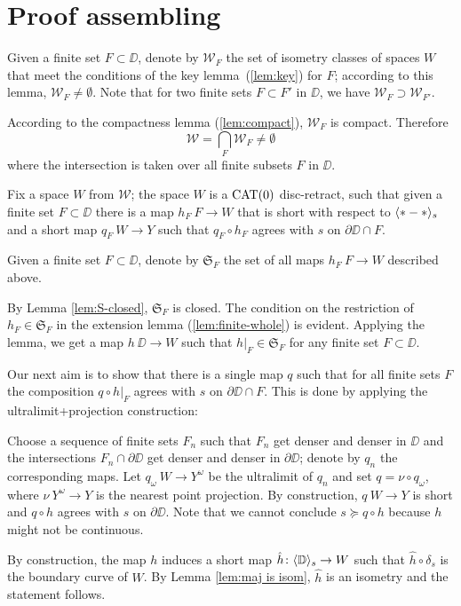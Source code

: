 \section{Proof assembling}\label{Main theorem}



Given a finite set $F\subset \DD$,
denote by $\mathcal{W}_F$
the set of isometry classes of spaces $W$ that meet the conditions of the key lemma~(\ref{lem:key})
for $F$;
according to this lemma, $\mathcal{W}_F\ne\emptyset$.
Note that for two finite sets $F\subset F'$ in $\DD$,
we have $\mathcal{W}_F\supset \mathcal{W}_{F'}$.

According to the compactness lemma (\ref{lem:compact}), $\mathcal{W}_F$ is compact.
Therefore 
\[\mathcal{W}
=
\bigcap_{F}\mathcal{W}_F\ne \emptyset\]
where the intersection is taken over all finite subsets $F$ in $\DD$. 


Fix a space $W$ from $\mathcal{W}$;
the space $W$ is a $\mathop{\rm CAT}\nolimits(0)$ disc-retract,
such that given a finite set $F\subset \DD$ there is a map $h_F\:F\to W$ that is short with 
respect to $\langle{*}-{*}\rangle_s$ 
and a short map $q_F\:W\to Y$ such that $q_F\circ h_F$ agrees with $s$ on $\partial\DD\cap F$.

Given a finite set $F\subset \DD$,
denote by $\mathfrak{S}_F$ the set of all maps $h_F\:F\to W$ described above.

By Lemma \ref{lem:S-closed}, $\mathfrak{S}_F$ is closed.
The condition on the restriction of $h_F\in  \mathfrak{S}_F$ in the extension lemma (\ref{lem:finite-whole}) is evident.
Applying the lemma,
we get a map $h\:\DD\to W$ such that $h|_F\in \mathfrak{S}_F$
for any finite set $F\subset \DD$.

Our next aim is to show that there is a single map $q$ such that
for all finite sets $F$ the composition $q\circ h|_F$ agrees with
$s$ on $\partial\DD\cap F$.
This is done by applying the ultralimit+projection construction:

Choose a sequence of finite sets $F_n$ such that $F_n$ get denser and denser in $\DD$ and
the intersections $F_n\cap\partial \DD$ get denser and denser in $\partial \DD$; 
denote by $q_n$ the corresponding maps.
Let $q_\omega\:W\to Y^\omega$ be the ultralimit of $q_n$ and set $q=\nu\circ q_\omega$,
where $\nu\:Y^\omega\to Y$ is the nearest point projection.
By construction, $q\:W\to Y$ is short and $q\circ h$ agrees with $s$ on $\partial \DD$.
Note that we cannot conclude $s\succcurlyeq q\circ h$ because $h$ might not be continuous.

By construction, the map $h$ induces a short map $\hat h\colon\langle\mathbb{D}\rangle_s\to W$ 
such that $\hat h\circ\delta_s$ is the boundary curve of $W$.
By Lemma \ref{lem:maj is isom}, $\hat h$ is an isometry and the statement follows.
\qeds
